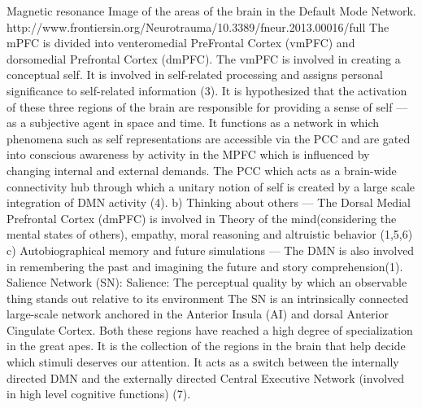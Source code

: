 \documentclass[twocolumn]{article}
\begin{document}
Magnetic resonance Image of the areas of the brain in the Default Mode Network. http://www.frontiersin.org/Neurotrauma/10.3389/fneur.2013.00016/full
The mPFC is divided into venteromedial PreFrontal Cortex (vmPFC) and dorsomedial Prefrontal Cortex (dmPFC). The vmPFC is involved in creating a conceptual self. It is involved in self-related processing and assigns personal significance to self-related information (3).
It is hypothesized that the activation of these three regions of the brain are responsible for providing a sense of self — as a subjective agent in space and time. It functions as a network in which phenomena such as self representations are accessible via the PCC and are gated into conscious awareness by activity in the MPFC which is influenced by changing internal and external demands. The PCC which acts as a brain-wide connectivity hub through which a unitary notion of self is created by a large scale integration of DMN activity (4).
b) Thinking about others —
The Dorsal Medial Prefrontal Cortex (dmPFC) is involved in Theory of the mind(considering the mental states of others), empathy, moral reasoning and altruistic behavior (1,5,6)
c) Autobiographical memory and future simulations —
The DMN is also involved in remembering the past and imagining the future and story comprehension(1).
Salience Network (SN):
Salience: The perceptual quality by which an observable thing stands out relative to its environment
The SN is an intrinsically connected large-scale network anchored in the Anterior Insula (AI) and dorsal Anterior Cingulate Cortex. Both these regions have reached a high degree of specialization in the great apes. It is the collection of the regions in the brain that help decide which stimuli deserves our attention. It acts as a switch between the internally directed DMN and the externally directed Central Executive Network (involved in high level cognitive functions) (7).
\end{document}
